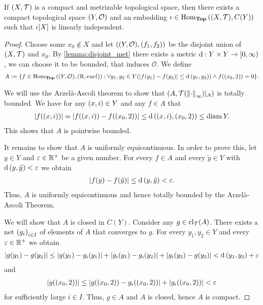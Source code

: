 \begin{lemma}
	If $\tspace$ is a compact and metrizable topological space, then there exists a compact topological space $\tspace[Y][O]$ and an embedding $\iota \in \Hom_\Top\pbraces{\tspace, C(Y)}$ such that $\iota\bbraces{X}$ is linearly independent. 
\end{lemma}

\begin{proof}
	Choose some $x_0 \notin X$ and let $\pbraces{\tspace[Y][O], (f_1, f_2)}$ be the disjoint union of $\tspace$ and $x_0$. By \ref{lemma:disjoint_met} there exists a metric $\metric: Y \times Y \to [0, \infty)$, we can choose it to be bounded, that induces $\mathcal{O}$. We define
	\begin{align*}
		A := \Bbraces{f \in \Hom_\Top\pbraces{\tspace[Y][O], \pbraces{\R, \eucl}} : \forall y_1, y_2 \in Y\pbraces{\vbraces{f(y_1) - f(y_2)} \leq \metric\pbraces{y_1, y_2}} \land f\pbraces{\pbraces{x_0, 2}} = 0}.
	\end{align*}
	
	We will use the Arzelà-Ascoli theorem \cite[p. 458]{Ana1&2} to show that $\pbraces{A, \mathcal{T}\pbraces{\norm[\infty]{\cdot}}\vert_A}$ is totally bounded. We have for any $\pbraces{x,i} \in Y$ and any $f \in A$ that
	\begin{align*}
		\vbraces{f\pbraces{(x,i)}} = \vbraces{f\pbraces{(x,i)} - f\pbraces{\pbraces{x_0, 2}}} \leq \metric\pbraces{(x,i), \pbraces{x_0, 2}} \leq \diam Y.
	\end{align*}
	This shows that $A$ is pointwise bounded.
	
	It remains to show that $A$ is uniformly equicontinuous. In order to prove this, let $y \in Y$ and $\varepsilon \in \R^+$ be a given number. For every $f \in A$ and every $\tilde{y} \in Y$ with $\metric\pbraces{y, \tilde{y}} < \varepsilon$ we obtain
	\begin{align*}
		\vbraces{f(y) - f\pbraces{\tilde{y}}} \leq \metric\pbraces{y, \tilde{y}} < \varepsilon.
	\end{align*}
	Thus, $A$ is uniformly equicontinuous and hence totally bounded by the Arzelà-Ascoli Theorem.
	
	We will show that $A$ is closed in $C(Y)$. Consider any $g \in \cl{A}$. There exists a net $\pbraces{g_i}_{i \in I}$ of elements of $A$ that converges to $g$. For every $y_1, y_2 \in Y$ and every $\varepsilon \in \R^+$ we obtain
	\begin{align*}
		\vbraces{g\pbraces{y_1} - g\pbraces{y_2}} \leq \vbraces{g\pbraces{y_1} - g_i\pbraces{y_1}} + \vbraces{g_i\pbraces{y_1} - g_i\pbraces{y_2}} + \vbraces{g_i\pbraces{y_2} - g\pbraces{y_2}} < \metric\pbraces{y_1, y_2} + \varepsilon
	\end{align*} 
	and 
	\begin{align*}
		\vbraces{g\pbraces{\pbraces{x_0, 2}}} \leq \vbraces{g\pbraces{\pbraces{x_0, 2}} - g_i\pbraces{\pbraces{x_0, 2}}} + \vbraces{g_i\pbraces{\pbraces{x_0, 2}}} < \varepsilon
	\end{align*}
	for sufficiently large $i \in I$. Thus, $g \in A$ and $A$ is closed, hence $A$ is compact. 
	

\end{proof}
